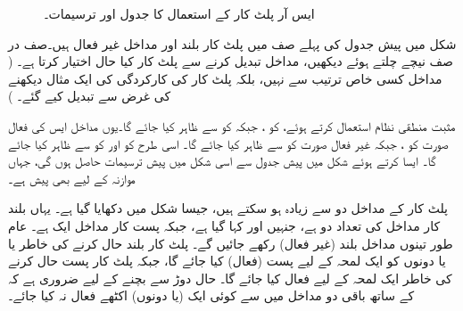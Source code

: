 \begin{figure}
\begin{subfigure}{0.45\textwidth}
\end{subfigure}
\caption{ایس آر پلٹ کار کے استعمال کا جدول اور ترسیمات۔}
\label{جدول_ترتیبی_ایس_آر_کام}
\end{figure}

شکل  میں پیش جدول کی پہلے صف میں پلٹ کار بلند  اور مداخل غیر فعال ہیں۔صف در صف نیچے چلتے ہوئے دیکھیں، مداخل تبدیل کرنے سے پلٹ کار کیا حال اختیار کرتا ہے۔ ( مداخل کسی خاص ترتیب سے نہیں، بلکہ پلٹ کار کی کارکردگی کی ایک مثال دیکھنے کی غرض سے تبدیل کیے گئے۔ )

مثبت منطقی نظام استعمال کرتے ہوئے، کو ، جبکہ  کو  سے ظاہر کیا جائے گا۔یوں مداخل ایس کی فعال صورت  کو ، جبکہ غیر فعال صورت  کو  سے ظاہر کیا جائے گا۔ اسی طرح  کو  اور  کو  سے ظاہر کیا جائے گا۔ ایسا کرتے ہوئے شکل  میں پیش جدول سے اسی شکل میں پیش ترسیمات حاصل ہوں گی، جہاں موازنہ کے لیے  بھی پیش ہے۔




پلٹ کار کے مداخل دو سے زیادہ ہو سکتے ہیں، جیسا شکل  میں دکھایا گیا ہے۔ یہاں بلند کار مداخل کی تعداد دو ہے، جنہیں  اور  کہا گیا ہے، جبکہ پست کار مداخل ایک ہے۔ عام طور تینوں مداخل بلند (غیر فعال) رکھے جائیں گے۔ پلٹ کار بلند حال کرنے کی خاطر  یا  یا دونوں کو ایک لمحہ کے لیے پست (فعال) کیا جائے گا، جبکہ پلٹ کار پست حال کرنے کی خاطر  ایک لمحہ کے لیے فعال کیا جائے گا۔ حال دوڑ سے بچنے کے لیے ضروری ہے کہ  کے ساتھ باقی دو مداخل میں سے کوئی ایک (یا دونوں) اکٹھے فعال نہ کیا جائے۔


